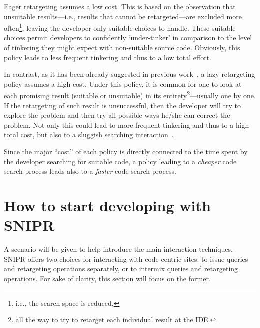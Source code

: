 Eager retargeting assumes a low cost. This is based on the observation that unsuitable results---i.e., results that cannot be retargeted---are excluded more often\footnote{i.e., the search space is reduced.}, leaving the developer only suitable choices to handle. These suitable choices permit developers to confidently `under-tinker' in comparison to the level of tinkering they might expect with non-suitable source code. Obviously, this policy leads to less frequent tinkering and thus to a low total effort.

In contrast, as it has been already suggested in previous work~\cite{Brandt:2009ew, Wightman:2012gc}, a lazy retargeting policy assumes a high cost. Under this policy, it is common for one to look at each promising result (suitable or unsuitable) in its entirety\footnote{all the way to try to retarget each individual result at the IDE.}---usually one by one. If the retargeting of such result is unsuccessful, then the developer will try to explore the problem and then try all possible ways he/she can correct the problem. Not only this could lead to more frequent tinkering and thus to a high total cost, but also to a sluggish searching interaction~\cite{Gray:2000im}.

Since the major ``cost'' of each policy is directly connected to the time spent by the developer searching for suitable code, a policy leading to a \emph{cheaper} code search process leads also to a \emph{faster} code search process.

% 
% 
% 


\section{How to start developing with \uppercase{SnipR}}
\label{sec:sniprscenario}

A scenario will be given to help introduce the main interaction techniques. \uppercase{SnipR} offers two choices for interacting with code-centric sites: to issue queries and retargeting operations separately, or to intermix queries and retargeting operations. For sake of clarity, this section will focus on the former.

